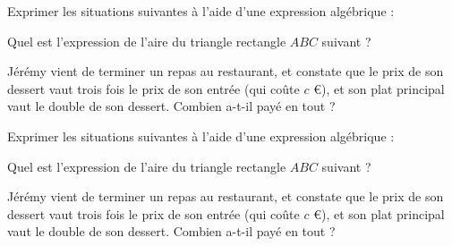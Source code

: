 \documentclass{exos}
\begin{document}
\begin{exercize}
Exprimer les situations suivantes à l'aide d'une expression algébrique :
\begin{alphaquestions}
\item Quel est l'expression de l'aire du triangle rectangle $ABC$ suivant ?
\begin{center}
\end{center}
\item Jérémy vient de terminer un repas au restaurant, et constate que le prix de son dessert vaut trois fois le prix de son entrée (qui coûte $c$ €), et son plat principal vaut le double de son dessert. Combien a-t-il payé en tout ?
\end{alphaquestions}
\end{exercize}
\vspace*{2cm}
\begin{exercize}
Exprimer les situations suivantes à l'aide d'une expression algébrique :
\begin{alphaquestions}
\item Quel est l'expression de l'aire du triangle rectangle $ABC$ suivant ?
\begin{center}
\end{center}
\item Jérémy vient de terminer un repas au restaurant, et constate que le prix de son dessert vaut trois fois le prix de son entrée (qui coûte $c$ €), et son plat principal vaut le double de son dessert. Combien a-t-il payé en tout ?
\end{alphaquestions}
\end{exercize}
\end{document}
